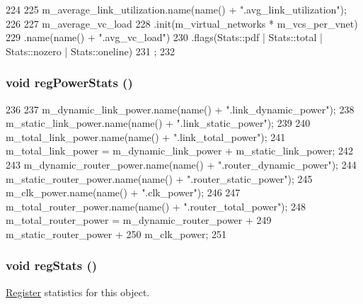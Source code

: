 \begin{DoxyCode}
224 {
225     m_average_link_utilization.name(name() + ".avg_link_utilization");
226 
227     m_average_vc_load
228         .init(m_virtual_networks * m_vcs_per_vnet)
229         .name(name() + ".avg_vc_load")
230         .flags(Stats::pdf | Stats::total | Stats::nozero | Stats::oneline)
231         ;
232 }
\end{DoxyCode}
\hypertarget{classGarnetNetwork__d_acd2f94805e8913b3d4238a57c39b320c}{
\subsubsection[{regPowerStats}]{\setlength{\rightskip}{0pt plus 5cm}void regPowerStats ()}}
\label{classGarnetNetwork__d_acd2f94805e8913b3d4238a57c39b320c}



\begin{DoxyCode}
236 {
237     m_dynamic_link_power.name(name() + ".link_dynamic_power");
238     m_static_link_power.name(name() + ".link_static_power");
239 
240     m_total_link_power.name(name() + ".link_total_power");
241     m_total_link_power = m_dynamic_link_power + m_static_link_power;
242 
243     m_dynamic_router_power.name(name() + ".router_dynamic_power");
244     m_static_router_power.name(name() + ".router_static_power");
245     m_clk_power.name(name() + ".clk_power");
246 
247     m_total_router_power.name(name() + ".router_total_power");
248     m_total_router_power = m_dynamic_router_power +
249                            m_static_router_power +
250                            m_clk_power;
251 }
\end{DoxyCode}
\hypertarget{classGarnetNetwork__d_a4dc637449366fcdfc4e764cdf12d9b11}{
\subsubsection[{regStats}]{\setlength{\rightskip}{0pt plus 5cm}void regStats ()}}
\label{classGarnetNetwork__d_a4dc637449366fcdfc4e764cdf12d9b11}
\hyperlink{classRegister}{Register} statistics for this object. 

